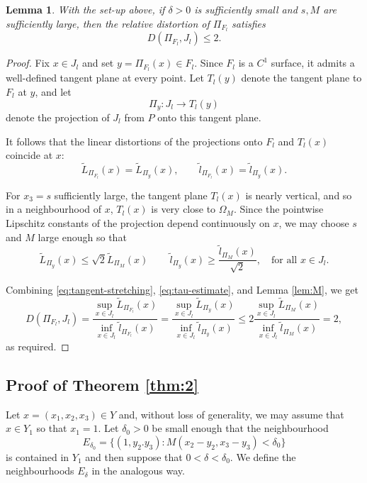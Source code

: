 \documentclass[11pt]{amsart}
\newtheorem{lemma}[theorem]{Lemma}
\numberwithin{equation}{section}
\theoremstyle{definition}
\theoremstyle{definition}
\theoremstyle{definition}
\begin{document}
\begin{lemma}\label{face-distortion}
With the set-up above, if $\delta>0$ is sufficiently small and $s,M$ are sufficiently large, then the relative distortion of $\Pi_{F_l}$ satisfies
\[ D(\Pi_{F_l} , J_l) \leq 2.\]
\end{lemma}


\begin{proof}
Fix $x \in J_l$ and set $y = \Pi_{F_l}(x) \in F_l$. Since $F_l$ is a $C^1$ surface, it admits a well-defined tangent plane at every
point. Let $T_l(y)$ denote the tangent plane to $F_l$ at $y$, and let
\[
\Pi_y : J_l \to T_l(y)
\]
denote the projection of $J_l$ from $P$ onto this tangent plane. 

It follows that the linear distortions of the projections onto $F_l$ and $T_l(x)$ coincide at $x$:
\begin{equation}\label{eq:tangent-stretching}
\tilde L_{\Pi_{F_l}}(x) = \tilde L_{\Pi_y}(x),
\qquad
\tilde l_{\Pi_{F_l}}(x) = \tilde l_{\Pi_y}(x).
\end{equation}

For $x_3 = s$ sufficiently large, the tangent plane $T_l(x)$ is nearly vertical, and so in a neighbourhood of $x$, $T_l(x)$ is very close to $\Omega_M$. Since the pointwise Lipschitz constants of the projection depend continuously on $x$, we may choose $s$ and $M$ large enough so that
\begin{equation}\label{eq:tau-estimate}
 \tilde L_{\Pi_y}(x) \leq \sqrt{2} \tilde L_{\Pi_M}(x) \,
\qquad
\tilde l_{\Pi_y}(x) \geq \frac{\tilde l_{\Pi_M}(x)}{\sqrt{2}},
\quad \text{for all } x \in J_l.
\end{equation}

Combining \eqref{eq:tangent-stretching}, \eqref{eq:tau-estimate}, and Lemma \ref{lem:M}, we get
\[
D(\Pi_{F_l}, J_l)
=
\frac{\sup_{x \in J_l} \tilde L_{\Pi_{F_l}}(x)}
     {\inf_{x \in J_l} \tilde l_{\Pi_{F_l}}(x)}
=
\frac{\sup_{x \in J_l} \tilde L_{\Pi_y}(x)}
     {\inf_{x \in J_l} \tilde l_{\Pi_y}(x)}
\le
2 \frac{\sup_{x \in J_l} \tilde L_{\Pi_M}(x) }
     {\inf_{x \in J_l} \tilde l_{\Pi_M}(x) }
= 2 ,     
\]
as required.
\end{proof}



\subsection{Proof of Theorem \ref{thm:2}}

Let $x = (x_1,x_2,x_3) \in Y$ and, without loss of generality, we may assume that $x\in Y_1$ so that $x_1 = 1$. Let $\delta_0>0$ be small enough that the neighbourhood 
\[ E_{\delta_0} = \{ (1,y_2.y_3) : M(x_2-y_2,x_3-y_3) < \delta_0 \}\]
is contained in $Y_1$ and then suppose that $0<\delta <\delta_0$. We define the neighbourhoods $E_{\delta}$ in the analogous way. 
\end{document}
